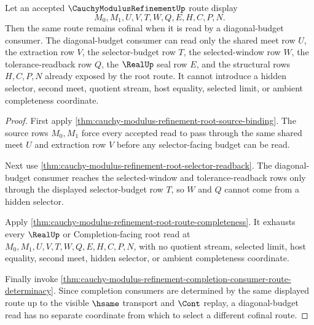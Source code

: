 \begin{theorem}
\label{thm:cauchy-modulus-refinement-diagonal-budget-cofinality-route}
Let an accepted $\CauchyModulusRefinementUp$ route display
$$
M_0,M_1,U,V,T,W,Q,E,H,C,P,N.
$$
Then the same route remains cofinal when it is read by a diagonal-budget
consumer. The diagonal-budget consumer can read only the shared meet row $U$,
the extraction row $V$, the selector-budget row $T$, the selected-window row
$W$, the tolerance-readback row $Q$, the $\RealUp$ seal row $E$, and the
structural rows $H,C,P,N$ already exposed by the root route. It cannot
introduce a hidden selector, second meet, quotient stream, host equality,
selected limit, or ambient completeness coordinate.
\end{theorem}
\begin{proof}
First apply \autoref{thm:cauchy-modulus-refinement-root-source-binding}. The
source rows $M_0,M_1$ force every accepted read to pass through the same shared
meet $U$ and extraction row $V$ before any selector-facing budget can be read.

Next use \autoref{thm:cauchy-modulus-refinement-root-selector-readback}. The
diagonal-budget consumer reaches the selected-window and tolerance-readback
rows only through the displayed selector-budget row $T$, so $W$ and $Q$ cannot
come from a hidden selector.

Apply \autoref{thm:cauchy-modulus-refinement-root-route-completeness}. It
exhausts every $\RealUp$ or Completion-facing root read at
$M_0,M_1,U,V,T,W,Q,E,H,C,P,N$, with no quotient stream, selected limit, host
equality, second meet, hidden selector, or ambient completeness coordinate.

Finally invoke
\autoref{thm:cauchy-modulus-refinement-completion-consumer-route-determinacy}.
Since completion consumers are determined by the same displayed route up to
the visible $\hsame$ transport and $\Cont$ replay, a diagonal-budget read has
no separate coordinate from which to select a different cofinal route.
\end{proof}

